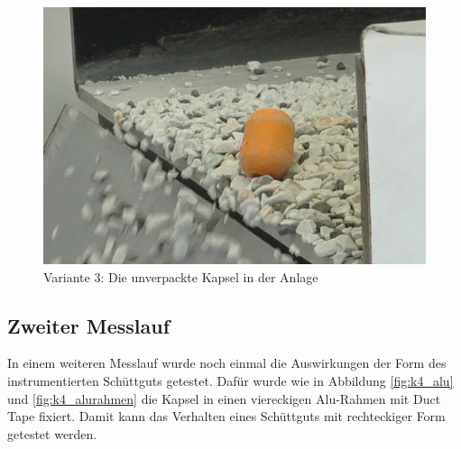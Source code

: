 \begin{figure}[htb]
	\centering
	\begin{minipage}[t]{0.49\linewidth}
		\centering
		\includegraphics[width=1\linewidth]{images/k4-kapsel.JPG}
		\caption{Variante 3: Die unverpackte Kapsel in der Anlage}
		\label{fig:k4_kapsel}
	\end{minipage}%
\end{figure}

\subsection{Zweiter Messlauf}

In einem weiteren Messlauf wurde noch einmal die Auswirkungen der Form des instrumentierten Schüttguts getestet. Dafür wurde wie in Abbildung \ref{fig:k4_alu} und \ref{fig:k4_alurahmen} die Kapsel in einen viereckigen Alu-Rahmen  mit Duct Tape fixiert. Damit kann das Verhalten eines Schüttguts mit rechteckiger Form getestet werden. 

